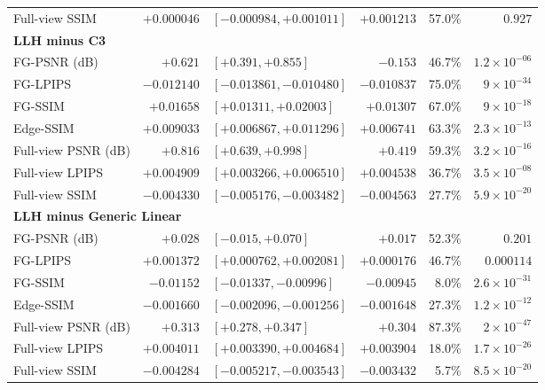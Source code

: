 \documentclass[11pt]{article}
\begin{document}
\begin{longtable}{p{2.7cm}r l r r r}
Full-view SSIM & $+0.000046$ & $[-0.000984, +0.001011]$ & $+0.001213$ & 57.0\% & $0.927$ \\
\multicolumn{6}{l}{\textbf{LLH minus C3}}\\
FG-PSNR (dB) & $+0.621$ & $[+0.391, +0.855]$ & $-0.153$ & 46.7\% & $1.2\times 10^{-06}$ \\
FG-LPIPS & $-0.012140$ & $[-0.013861, -0.010480]$ & $-0.010837$ & 75.0\% & $9\times 10^{-34}$ \\
FG-SSIM & $+0.01658$ & $[+0.01311, +0.02003]$ & $+0.01307$ & 67.0\% & $9\times 10^{-18}$ \\
Edge-SSIM & $+0.009033$ & $[+0.006867, +0.011296]$ & $+0.006741$ & 63.3\% & $2.3\times 10^{-13}$ \\
Full-view PSNR (dB) & $+0.816$ & $[+0.639, +0.998]$ & $+0.419$ & 59.3\% & $3.2\times 10^{-16}$ \\
Full-view LPIPS & $+0.004909$ & $[+0.003266, +0.006510]$ & $+0.004538$ & 36.7\% & $3.5\times 10^{-08}$ \\
Full-view SSIM & $-0.004330$ & $[-0.005176, -0.003482]$ & $-0.004563$ & 27.7\% & $5.9\times 10^{-20}$ \\
\multicolumn{6}{l}{\textbf{LLH minus Generic Linear}}\\
FG-PSNR (dB) & $+0.028$ & $[-0.015, +0.070]$ & $+0.017$ & 52.3\% & $0.201$ \\
FG-LPIPS & $+0.001372$ & $[+0.000762, +0.002081]$ & $+0.000176$ & 46.7\% & $0.000114$ \\
FG-SSIM & $-0.01152$ & $[-0.01337, -0.00996]$ & $-0.00945$ & 8.0\% & $2.6\times 10^{-31}$ \\
Edge-SSIM & $-0.001660$ & $[-0.002096, -0.001256]$ & $-0.001648$ & 27.3\% & $1.2\times 10^{-12}$ \\
Full-view PSNR (dB) & $+0.313$ & $[+0.278, +0.347]$ & $+0.304$ & 87.3\% & $2\times 10^{-47}$ \\
Full-view LPIPS & $+0.004011$ & $[+0.003390, +0.004684]$ & $+0.003904$ & 18.0\% & $1.7\times 10^{-26}$ \\
Full-view SSIM & $-0.004284$ & $[-0.005217, -0.003543]$ & $-0.003432$ & 5.7\% & $8.5\times 10^{-20}$ \\
\bottomrule
\end{longtable}

\endgroup
\end{document}
